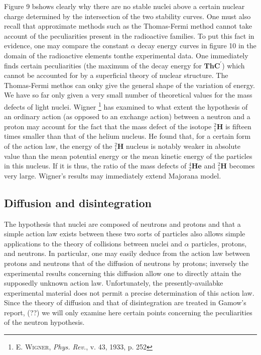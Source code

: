 \documentclass{article}
\newcommand{\element}[1]{\textbf{#1}}
\newcommand{\isotope}[3]{
{{}^{#3}_{#2}\element{#1}}
}
\newcommand{\primed}[1]{{#1^{\prime}}}
\begin{document}
Figure 9 bshows clearly why there are no stable nuclei above a certain nuclear charge determined by the intersection of the two stability curves. One must also recall that approximate methods such as the Thomas-Fermi method cannot take account of the peculiarities present in the radioactive families. To put this fact in evidence, one may compare the constant $\alpha$ decay energy curves in figure 10 in the domain of the radioactive elements tonthe experimental data. One immediately finds certain peculiarities (the maximum of the decay energy for $\primed{\element{ThC}}$) which cannot be accounted for by a superficial theory of nuclear structure. The Thomas-Fermi methos can onky give the general shape of the variation of energy.
We have so far only given a very small number of theoretical values for the mass defects of light nuclei. Wigner \footnote{\textsc{E. Wigner}, \textit{Phys. Rev.}, v. 43, 1933, p. 252} has examined to what extent the hypothesis of an ordinary action (as opposed to an exchange action) between a neutron and a proton may account for the fact that the mass defect of the isotope $\isotope{H}{1}{2}$ is fifteen times smaller than that of the helium nucleus. He found that, for a certain form of the action law, the energy of the $\isotope{H}{1}{2}$ nucleus is notably weaker in absolute value than the mean potential energy or the mean kinetic energy of the particles in this nucleus. If it is thus, the ratio of the mass defects of $\isotope{He}{2}{4}$ and $\isotope{H}{1}{2}$ becomes very large. Wigner's results may immediately extend Majorana model.

\subsection{Diffusion and disintegration}

The hypothesis that nuclei are composed of neutrons and protons and that a simple action law exists between these two sorts of particles also allows simple applications to the theory of collisions between nuclei and $\alpha$ particles, protons, and neutrons. In particular, one may easily deduce from the action law between protons and neutrons that of the diffusion of neutrons by protons; inversely the experimental results concerning this diffusion allow one to directly attain the  supposedly unknown action law. Unfortunately, the presently-availabke experimental material does not permit a precise determination of this action law. Since the theory of diffusion and that of disintegration are treated in Gamow's report, (??) we will only examine here certain points concerning the peculiarities of the neutron hypothesis.
\end{document}
